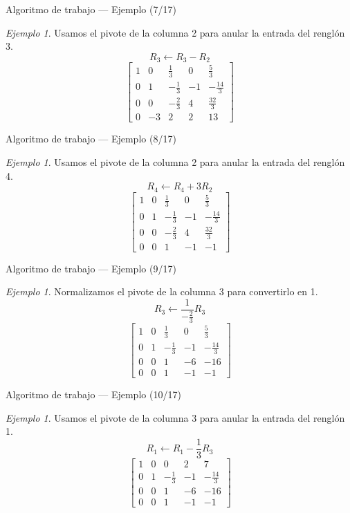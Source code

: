 \documentclass[aspectratio=169,11pt]{beamer}
\theoremstyle{remark}
\newtheorem{Ejem}[definicion]{Ejemplo}
\begin{document}
\begin{frame}{Algoritmo de trabajo — Ejemplo (7/17)}
\begin{Ejem}
Usamos el pivote de la columna 2 para anular la entrada del renglón 3.
\[
R_{3}\leftarrow R_{3}-R_{2}
\]
\[
\left[\begin{array}{cccc|c}
1 & 0 & \frac{1}{3} & 0 & \frac{5}{3}\\
0 & 1 & - \frac{1}{3} & -1 & - \frac{14}{3}\\
0 & 0 & - \frac{2}{3} & 4 & \frac{32}{3}\\
0 & -3 & 2 & 2 & 13
\end{array}\right]
\]
\end{Ejem}
\end{frame}

\begin{frame}{Algoritmo de trabajo — Ejemplo (8/17)}
\begin{Ejem}
Usamos el pivote de la columna 2 para anular la entrada del renglón 4.
\[
R_{4}\leftarrow R_{4}+3R_{2}
\]
\[
\left[\begin{array}{cccc|c}
1 & 0 & \frac{1}{3} & 0 & \frac{5}{3}\\
0 & 1 & - \frac{1}{3} & -1 & - \frac{14}{3}\\
0 & 0 & - \frac{2}{3} & 4 & \frac{32}{3}\\
0 & 0 & 1 & -1 & -1
\end{array}\right]
\]
\end{Ejem}
\end{frame}

\begin{frame}{Algoritmo de trabajo — Ejemplo (9/17)}
\begin{Ejem}
Normalizamos el pivote de la columna 3 para convertirlo en 1.
\[
R_{3}\leftarrow \frac{1}{- \frac{2}{3}}R_{3}
\]
\[
\left[\begin{array}{cccc|c}
1 & 0 & \frac{1}{3} & 0 & \frac{5}{3}\\
0 & 1 & - \frac{1}{3} & -1 & - \frac{14}{3}\\
0 & 0 & 1 & -6 & -16\\
0 & 0 & 1 & -1 & -1
\end{array}\right]
\]
\end{Ejem}
\end{frame}

\begin{frame}{Algoritmo de trabajo — Ejemplo (10/17)}
\begin{Ejem}
Usamos el pivote de la columna 3 para anular la entrada del renglón 1.
\[
R_{1}\leftarrow R_{1}-\frac{1}{3}R_{3}
\]
\[
\left[\begin{array}{cccc|c}
1 & 0 & 0 & 2 & 7\\
0 & 1 & - \frac{1}{3} & -1 & - \frac{14}{3}\\
0 & 0 & 1 & -6 & -16\\
0 & 0 & 1 & -1 & -1
\end{array}\right]
\]
\end{Ejem}
\end{frame}
\end{document}
